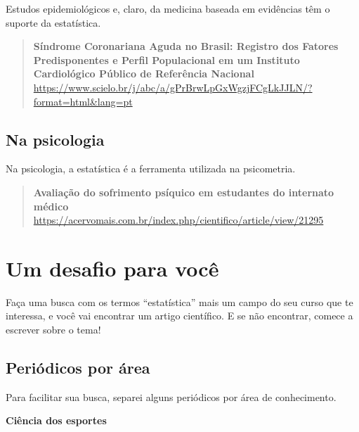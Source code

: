 \documentclass[
]{book}
\begin{document}
Estudos epidemiológicos e, claro, da medicina baseada em evidências têm o suporte da estatística.

\begin{quote}
\textbf{Síndrome Coronariana Aguda no Brasil: Registro dos Fatores Predisponentes e Perfil Populacional em um Instituto Cardiológico Público de Referência Nacional}\\
\url{https://www.scielo.br/j/abc/a/gPrBrwLpGxWgzjFCgLkJJLN/?format=html&lang=pt}
\end{quote}

\subsection{Na psicologia}\label{na-psicologia}

Na psicologia, a estatística é a ferramenta utilizada na psicometria.

\begin{quote}
\textbf{Avaliação do sofrimento psíquico em estudantes do internato médico}\\
\url{https://acervomais.com.br/index.php/cientifico/article/view/21295}
\end{quote}

\section{Um desafio para você}\label{um-desafio-para-vocuxea}

Faça uma busca com os termos ``estatística'' mais um campo do seu curso que te interessa, e você vai encontrar um artigo científico. E se não encontrar, comece a escrever sobre o tema!

\subsection{Periódicos por área}\label{periuxf3dicos-por-uxe1rea}

Para facilitar sua busca, separei alguns periódicos por área de conhecimento.

\textbf{Ciência dos esportes}
\end{document}
